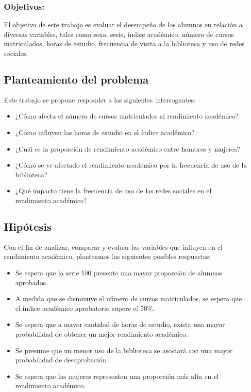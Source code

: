 \documentclass[
  a4paper,
]{article}
\providecommand{\tightlist}{%
  \setlength{\itemsep}{0pt}\setlength{\parskip}{0pt}}\usepackage{longtable,booktabs,array}
\begin{document}
\hypertarget{objetivos}{%
\subsubsection{Objetivos:}\label{objetivos}}

El objetivo de este trabajo es evaluar el desempeño de los alumnos en
relación a diversas variables, tales como sexo, serie, índice académico,
número de cursos matriculados, horas de estudio, frecuencia de visita a
la biblioteca y uso de redes sociales.

\hypertarget{planteamiento-del-problema}{%
\subsection{Planteamiento del
problema}\label{planteamiento-del-problema}}

Este trabajo se propone responder a las siguientes interrogantes:

\begin{itemize}
\tightlist
\item
  ¿Cómo afecta el número de cursos matriculados al rendimiento
  académico?
\item
  ¿Cómo influyen las horas de estudio en el índice académico?
\item
  ¿Cuál es la proporción de rendimiento académico entre hombres y
  mujeres?
\item
  ¿Cómo se ve afectado el rendimiento académico por la frecuencia de uso
  de la biblioteca?
\item
  ¿Qué impacto tiene la frecuencia de uso de las redes sociales en el
  rendimiento académico?
\end{itemize}

\hypertarget{hipuxf3tesis}{%
\subsection{Hipótesis}\label{hipuxf3tesis}}

Con el fin de analizar, comparar y evaluar las variables que influyen en
el rendimiento académico, planteamos las siguientes posibles respuestas:

\begin{itemize}
\tightlist
\item
  Se espera que la serie 100 presente una mayor proporción de alumnos
  aprobados.
\item
  A medida que se disminuye el número de cursos matriculados, se espera
  que el índice académico aprobatorio supere el 50\%.
\item
  Se espera que a mayor cantidad de horas de estudio, exista una mayor
  probabilidad de obtener un mejor rendimiento académico.
\item
  Se presume que un menor uso de la biblioteca se asociará con una mayor
  probabilidad de desaprobación.
\item
  Se espera que las mujeres representen una proporción más alta en el
  rendimiento académico.
\end{itemize}
\end{document}
